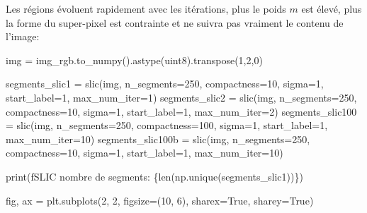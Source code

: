 \documentclass[
  11pt,
  letterpaper,
  open=any,
  twoside=false,
  french]{scrbook}
\newenvironment{Shaded}{\begin{snugshade}}{\end{snugshade}}
\newcommand{\BuiltInTok}[1]{\textcolor[rgb]{0.00,0.23,0.31}{#1}}
\newcommand{\DecValTok}[1]{\textcolor[rgb]{0.68,0.00,0.00}{#1}}
\newcommand{\NormalTok}[1]{\textcolor[rgb]{0.00,0.23,0.31}{#1}}
\newcommand{\OperatorTok}[1]{\textcolor[rgb]{0.37,0.37,0.37}{#1}}
\newcommand{\SpecialCharTok}[1]{\textcolor[rgb]{0.37,0.37,0.37}{#1}}
\newcommand{\SpecialStringTok}[1]{\textcolor[rgb]{0.13,0.47,0.30}{#1}}
\newcommand{\StringTok}[1]{\textcolor[rgb]{0.13,0.47,0.30}{#1}}
\newcommand{\VariableTok}[1]{\textcolor[rgb]{0.07,0.07,0.07}{#1}}
\begin{document}
Les régions évoluent rapidement avec les itérations, plus le poids \(m\)
est élevé, plus la forme du super-pixel est contrainte et ne suivra pas
vraiment le contenu de l'image:

\begin{Shaded}
\begin{Highlighting}[]
\NormalTok{img }\OperatorTok{=}\NormalTok{ img\_rgb.to\_numpy().astype(}\StringTok{\textquotesingle{}uint8\textquotesingle{}}\NormalTok{).transpose(}\DecValTok{1}\NormalTok{,}\DecValTok{2}\NormalTok{,}\DecValTok{0}\NormalTok{) }

\NormalTok{segments\_slic1 }\OperatorTok{=}\NormalTok{ slic(img, n\_segments}\OperatorTok{=}\DecValTok{250}\NormalTok{, compactness}\OperatorTok{=}\DecValTok{10}\NormalTok{, sigma}\OperatorTok{=}\DecValTok{1}\NormalTok{, start\_label}\OperatorTok{=}\DecValTok{1}\NormalTok{, max\_num\_iter}\OperatorTok{=}\DecValTok{1}\NormalTok{)}
\NormalTok{segments\_slic2 }\OperatorTok{=}\NormalTok{ slic(img, n\_segments}\OperatorTok{=}\DecValTok{250}\NormalTok{, compactness}\OperatorTok{=}\DecValTok{10}\NormalTok{, sigma}\OperatorTok{=}\DecValTok{1}\NormalTok{, start\_label}\OperatorTok{=}\DecValTok{1}\NormalTok{, max\_num\_iter}\OperatorTok{=}\DecValTok{2}\NormalTok{)}
\NormalTok{segments\_slic100 }\OperatorTok{=}\NormalTok{ slic(img, n\_segments}\OperatorTok{=}\DecValTok{250}\NormalTok{, compactness}\OperatorTok{=}\DecValTok{100}\NormalTok{, sigma}\OperatorTok{=}\DecValTok{1}\NormalTok{, start\_label}\OperatorTok{=}\DecValTok{1}\NormalTok{, max\_num\_iter}\OperatorTok{=}\DecValTok{10}\NormalTok{)}
\NormalTok{segments\_slic100b }\OperatorTok{=}\NormalTok{ slic(img, n\_segments}\OperatorTok{=}\DecValTok{250}\NormalTok{, compactness}\OperatorTok{=}\DecValTok{10}\NormalTok{, sigma}\OperatorTok{=}\DecValTok{1}\NormalTok{, start\_label}\OperatorTok{=}\DecValTok{1}\NormalTok{, max\_num\_iter}\OperatorTok{=}\DecValTok{10}\NormalTok{)}

\BuiltInTok{print}\NormalTok{(}\SpecialStringTok{f\textquotesingle{}SLIC nombre de segments: }\SpecialCharTok{\{}\BuiltInTok{len}\NormalTok{(np.unique(segments\_slic1))}\SpecialCharTok{\}}\SpecialStringTok{\textquotesingle{}}\NormalTok{)}

\NormalTok{fig, ax }\OperatorTok{=}\NormalTok{ plt.subplots(}\DecValTok{2}\NormalTok{, }\DecValTok{2}\NormalTok{, figsize}\OperatorTok{=}\NormalTok{(}\DecValTok{10}\NormalTok{, }\DecValTok{6}\NormalTok{), sharex}\OperatorTok{=}\VariableTok{True}\NormalTok{, sharey}\OperatorTok{=}\VariableTok{True}\NormalTok{)}


\end{Highlighting}
\end{Shaded}
\end{document}
